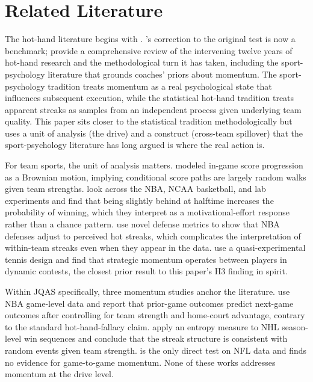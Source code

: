 \documentclass[11pt]{article}
\begin{document}
\section{Related Literature}\label{sec:lit}

The hot-hand literature begins with \citet{gilovich1985hot}.
\citet{miller2018surprised}'s correction to the original test is now a
benchmark; \citet{bareli2006twelve} provide a comprehensive review of the
intervening twelve years of hot-hand research and the methodological turn it
has taken, including the sport-psychology literature that grounds coaches'
priors about momentum. The sport-psychology tradition treats momentum as a
real psychological state that influences subsequent execution, while the
statistical hot-hand tradition treats apparent streaks as samples from an
independent process given underlying team quality. This paper sits closer to
the statistical tradition methodologically but uses a unit of analysis (the
drive) and a construct (cross-team spillover) that the sport-psychology
literature has long argued is where the real action is.

For team sports, the unit of analysis matters. \citet{stern1994probabilities}
modeled in-game score progression as a Brownian motion, implying conditional
score paths are largely random walks given team strengths.
\citet{berger2011hot} look across the NBA, NCAA basketball, and lab experiments
and find that being slightly behind at halftime increases the probability of
winning, which they interpret as a motivational-effort response rather than
a chance pattern. \citet{csapo2014hand} use novel defense metrics to show
that NBA defenses adjust to perceived hot streaks, which complicates the
interpretation of within-team streaks even when they appear in the data.
\citet{gauriot2019does} use a quasi-experimental tennis design and find that
strategic momentum operates between players in dynamic contests, the closest
prior result to this paper's H3 finding in spirit.

Within JQAS specifically, three momentum studies anchor the literature.
\citet{arkes2011finally} use NBA game-level data and report that prior-game
outcomes predict next-game outcomes after controlling for team strength and
home-court advantage, contrary to the standard hot-hand-fallacy claim.
\citet{steeger2021winning} apply an entropy measure to NHL season-level win
sequences and conclude that the streak structure is consistent with random
events given team strength. \citet{fry2012searching} is the only direct test
on NFL data and finds no evidence for game-to-game momentum. None of these
works addresses momentum at the drive level.
\end{document}
